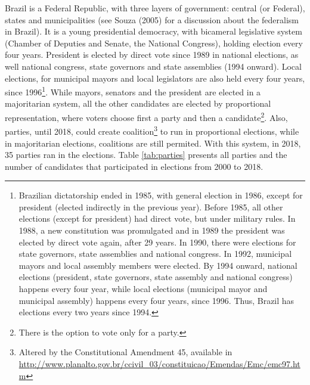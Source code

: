 \documentclass[
  12pt,
]{article}
\begin{document}
Brazil is a Federal Republic, with three layers of government: central
(or Federal), states and municipalities (see Souza (2005) for a
discussion about the federalism in Brazil). It is a young presidential
democracy, with bicameral legislative system (Chamber of Deputies and
Senate, the National Congress), holding election every four years.
President is elected by direct vote since 1989 in national elections, as
well national congress, state governors and state assemblies (1994
onward). Local elections, for municipal mayors and local legislators are
also held every four years, since 1996\footnote{Brazilian dictatorship
  ended in 1985, with general election in 1986, except for president
  (elected indirectly in the previous year). Before 1985, all other
  elections (except for president) had direct vote, but under military
  rules. In 1988, a new constitution was promulgated and in 1989 the
  president was elected by direct vote again, after 29 years. In 1990,
  there were elections for state governors, state assemblies and
  national congress. In 1992, municipal mayors and local assembly
  members were elected. By 1994 onward, national elections (president,
  state governors, state assembly and national congress) happens every
  four year, while local elections (municipal mayor and municipal
  assembly) happens every four years, since 1996. Thus, Brazil has
  elections every two years since 1994.}. While mayors, senators and the
president are elected in a majoritarian system, all the other candidates
are elected by proportional representation, where voters choose first a
party and then a candidate\footnote{There is the option to vote only for
  a party.}. Also, parties, until 2018, could create coalition\footnote{Altered
  by the Constitutional Amendment 45, available in
  \url{http://www.planalto.gov.br/ccivil_03/constituicao/Emendas/Emc/emc97.htm}}
to run in proportional elections, while in majoritarian elections,
coalitions are still permited. With this system, in 2018, 35 parties ran
in the elections. Table \ref{tab:parties} presents all parties and the
number of candidates that participated in elections from 2000 to 2018.
\end{document}
